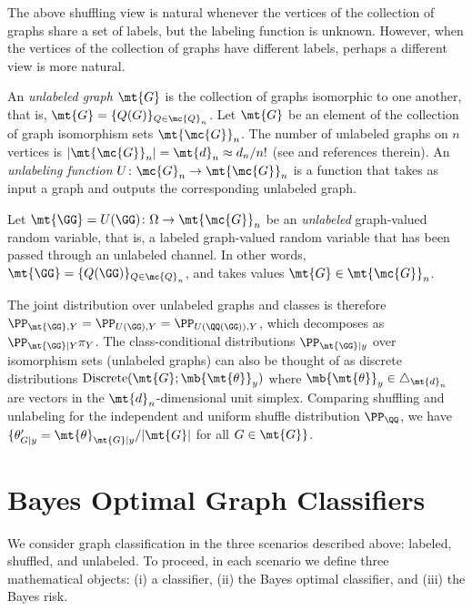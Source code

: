 \documentclass[10pt,journal,cspaper,compsoc]{IEEEtran}
\begin{document}

The above shuffling view is natural whenever the vertices of the collection of graphs share a set of labels, but the labeling function is unknown.   However, when the vertices of the collection of graphs have different labels, perhaps a different view is more natural.

An \emph{unlabeled graph} $\mt{G}$ is the collection of graphs isomorphic to one another, that is, $\mt{G}=\{Q(G)\}_{Q \in \mc{Q}_n}$. Let $\mt{G}$ be an element of the collection of graph isomorphism sets $\mt{\mc{G}}_n$. The number of unlabeled graphs on $n$ vertices is $|\mt{\mc{G}}_n|=\mt{d}_n \approx d_n/n!$ (see \cite{A000088} and references therein).
An \emph{unlabeling function} $U\colon \mc{G}_n \to \mt{\mc{G}}_n$ is a function that takes as input a graph and outputs the corresponding unlabeled graph. 
\begin{defi}
Let $\mt{\GG}=U(\GG)\colon \Omega \to \mt{\mc{G}}_n$ be an \emph{unlabeled} graph-valued random variable, that is, a labeled graph-valued random variable that has been passed through an unlabeled channel. In other words, $\mt{\GG}=\{Q(\GG)\}_{Q \in \mc{Q}_n}$, and takes values $\mt{G} \in \mt{\mc{G}}_n$. %
\end{defi}  
The joint distribution over unlabeled graphs and classes is therefore
$\PP_{\mt{\GG},Y}=\PP_{U(\GG),Y}=\PP_{U(\QQ(\GG)),Y}$, which decomposes as $\PP_{\mt{\GG}|Y} \pi_Y$. The class-conditional distributions $\PP_{\mt{\GG} | y}$ over isomorphism sets (unlabeled graphs) can also be thought of as discrete distributions $\text{Discrete}(\mt{G}; \mb{\mt{\theta}}_y)$ where $\mb{\mt{\theta}}_y\in \triangle_{\mt{d}_n}$ are vectors in the $\mt{d}_n$-dimensional unit simplex.   Comparing shuffling and unlabeling for the independent and uniform shuffle distribution $\PP_{\QQ}$, we have $\{\theta_{G|y}'=\mt{\theta}_{\mt{G}|y}/|\mt{G}|$ for all $G \in \mt{G}\}$.  




\section{Bayes Optimal Graph Classifiers} %
\label{sec:bayes_optimal_graph_classifiers}

We consider graph classification in the three scenarios described above: labeled, shuffled, and unlabeled.  To proceed, in each scenario we define three mathematical objects: (i) a classifier, (ii) the Bayes optimal classifier, and (iii) the Bayes risk.
\end{document}

